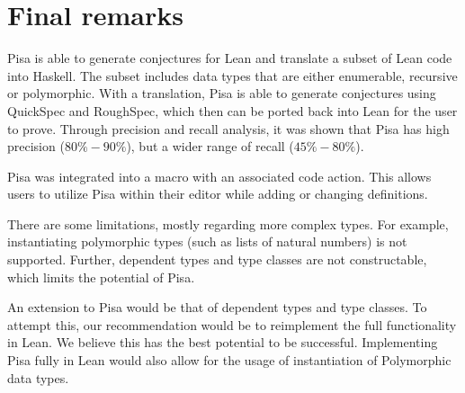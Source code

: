 \section{Final remarks}\label{sec:final-remarks}
Pisa is able to generate conjectures for Lean and translate a subset of Lean code into Haskell.
The subset includes data types that are either enumerable, recursive or polymorphic.
With a translation, Pisa is able to generate conjectures using QuickSpec and RoughSpec, which then can be ported back into Lean for the user to prove.
Through precision and recall analysis, it was shown that Pisa has high precision ($80\%-90\%$), but a wider range of recall ($45\%-80\%$).

Pisa was integrated into a macro with an associated code action.
This allows users to utilize Pisa within their editor while adding or changing definitions.

There are some limitations, mostly regarding more complex types.
For example, instantiating polymorphic types (such as lists of natural numbers) is not supported.
Further, dependent types and type classes are not constructable, which limits the potential of Pisa.

An extension to Pisa would be that of dependent types and type classes.
To attempt this, our recommendation would be to reimplement the full functionality in Lean.
We believe this has the best potential to be successful.
Implementing Pisa fully in Lean would also allow for the usage of instantiation of Polymorphic data types.
